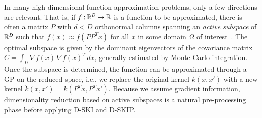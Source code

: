 In many high\hyp{}dimensional function approximation problems, only a few
directions are relevant. That is, if $f \mathbin{:} \mathbb{R}^D \to \mathbb{R}$ is a function
to be approximated, there is often a matrix $P$ with $d < D$ orthonormal columns
spanning an {\em active subspace} of $\mathbb{R}^D$ such that $f(x) \approx f(PP^T x)$
for all $x$ in some domain $\Omega$ of interest~\citep{constantine2015active}. 
The optimal subspace is given by the dominant eigenvectors of the covariance
matrix $C = \int_\Omega \nabla f(x) \, \nabla f(x)^T \, dx$, generally estimated
by Monte Carlo integration. Once the subspace is determined, the function can be
approximated through a GP on the reduced space, i.e., we replace the original
kernel $k(x,x')$ with a new kernel $\check k(x,x') = k(P^T x,P^T x')$.
Because we assume gradient information, dimensionality reduction based on active
subspaces is a natural pre\hyp{}processing phase before applying D\hyp{}SKI and
D\hyp{}SKIP.